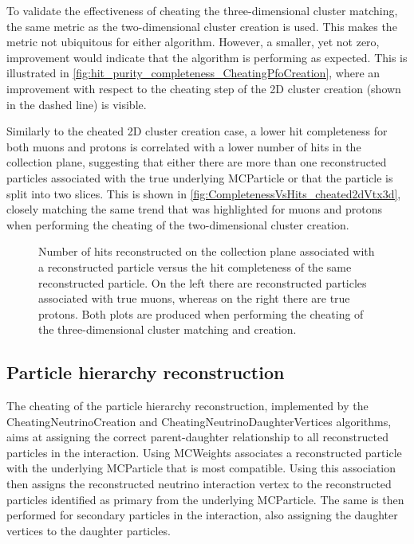 To validate the effectiveness of cheating the three-dimensional cluster matching, the same metric as the two-dimensional cluster creation is used. This makes the metric not ubiquitous for either algorithm. However, a smaller, yet not zero, improvement would indicate that the algorithm is performing as expected. This is illustrated in \autoref{fig:hit_purity_completeness_CheatingPfoCreation}, where an improvement with respect to the cheating step of the 2D cluster creation (shown in the dashed line) is visible. 

Similarly to the cheated 2D cluster creation case, a lower hit completeness for both muons and protons is correlated with a lower number of hits in the collection plane, suggesting that either there are more than one reconstructed particles associated with the true underlying MCParticle or that the particle is split into two slices. This is shown in \autoref{fig:CompletenessVsHits_cheated2dVtx3d}, closely matching the same trend that was highlighted for muons and protons when performing the cheating of the two-dimensional cluster creation. 

\begin{figure}
    \centering
    \caption[Hit completeness versus number of hits on collection plane]{Number of hits reconstructed on the collection plane associated with a reconstructed particle versus the hit completeness of the same reconstructed particle. On the left there are reconstructed particles associated with true muons, whereas on the right there are true protons. Both plots are produced when performing the cheating of the three-dimensional cluster matching and creation. }
    \label{fig:CompletenessVsHits_cheated2dVtx3d}
\end{figure}

\subsection{Particle hierarchy reconstruction} 

The cheating of the particle hierarchy reconstruction, implemented by the CheatingNeutrinoCreation and CheatingNeutrinoDaughterVertices algorithms, aims at assigning the correct parent-daughter relationship to all reconstructed particles in the interaction. Using MCWeights associates a reconstructed particle with the underlying MCParticle that is most compatible. Using this association then assigns the reconstructed neutrino interaction vertex to the reconstructed particles identified as primary from the underlying MCParticle. The same is then performed for secondary particles in the interaction, also assigning the daughter vertices to the daughter particles. 

